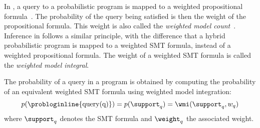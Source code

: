 In \problogsys, a query to a probabilistic program is mapped to a weighted propositional formula~\citep{fierens2015inference}. The probability of the query being satisfied is then the weight of the propositional formula. This weight is also called the {\em weighted model count}~\citep{darwiche2009modeling}.
Inference in \dcproblogsys follows a similar principle, with the difference that a hybrid probabilistic program is mapped to a weighted SMT formula, instead of a weighted propositional formula.
The weight of a weighted SMT formula is called the {\em weighted model integral}.

The probability of a query  in a \dcproblogsty program is obtained by computing the probability of an equivalent weighted SMT formula using weighted model integration:
\begin{align}
	p(\text{\probloginline{query(q)}})= p(\support_q) = \wmi(\support_q, w_q)
\end{align}
where $\support_q$ denotes the SMT formula and $\weight_q$ the associated weight.




